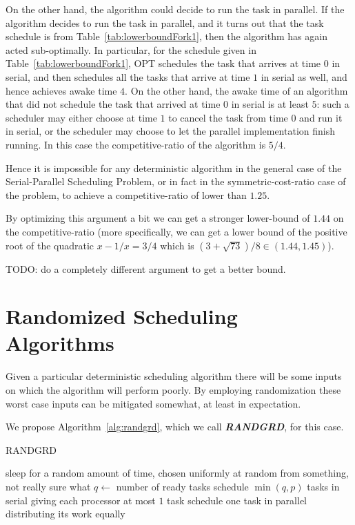 \documentclass[twocolumn]{article}[10pt]
\newcommand{\defn}[1]{{\textit{\textbf{\boldmath #1}}}\xspace}
\begin{document}
On the other hand, the algorithm could decide to run the task in
parallel. If the algorithm decides to run the task in parallel,
and it turns out that the task schedule is from
Table~\ref{tab:lowerboundFork1}, then the algorithm has again
acted sub-optimally. In particular, for the schedule given in
Table~\ref{tab:lowerboundFork1}, OPT schedules the task that
arrives at time $0$ in serial, and then schedules all the tasks
that arrive at time $1$ in serial as well, and hence achieves
awake time $4$. On the other hand, the awake time of an algorithm
that did not schedule the task that arrived at time $0$ in
serial is at least $5$: such a scheduler may either choose at
time $1$ to cancel the task from time $0$ and run it in serial,
or the scheduler may choose to let the parallel implementation
finish running. In this case the competitive-ratio of the
algorithm is $5/4$.

Hence it is impossible for any deterministic algorithm in the
general case of the Serial-Parallel Scheduling Problem, or in
fact in the symmetric-cost-ratio case of the problem, to achieve
a competitive-ratio of lower than $1.25$.

By optimizing this argument a bit we can get a stronger
lower-bound of $1.44$ on the competitive-ratio (more
specifically, we can get a lower bound of the positive root of
the quadratic $x - 1/x = 3/4$ which is $(3+\sqrt{73})/8 \in
(1.44, 1.45)$).

{\color{red} TODO: do a completely different argument to get a
better bound. }

\section{Randomized Scheduling Algorithms}
Given a particular deterministic scheduling algorithm there will
be some inputs on which the algorithm will perform poorly. 
By employing randomization these worst case inputs can be
mitigated somewhat, at least in expectation.

We propose Algorithm~\ref{alg:randgrd}, which we call
\defn{RANDGRD}, for this case.

\begin{algorithm}
  \caption{RANDGRD}
  \label{alg:randgrd}
  \begin{algorithmic}
        \State sleep for a random amount of time, chosen
        uniformly at random from something, not really sure what 
        \State $q \gets $ number of ready tasks
          \State schedule $\min(q, p)$ tasks in serial
          \State giving each processor at most $1$ task
        \Else
          \State schedule one task in parallel
          \State distributing its work equally 
        \EndIf
      \EndIf
    \EndWhile
  \end{algorithmic}
\end{algorithm}
\end{document}
